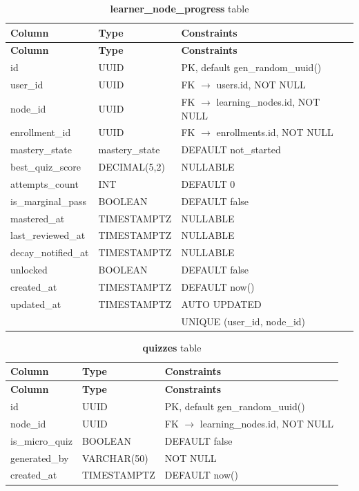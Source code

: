 \begin{longtable}{p{3cm}p{2.5cm}p{5cm}}
\caption{\textbf{learner\_node\_progress} table}
\label{tab:ch04_learner_node_progress}\\
\toprule
\textbf{Column} & \textbf{Type} & \textbf{Constraints} \\
\midrule
\endfirsthead
\toprule
\textbf{Column} & \textbf{Type} & \textbf{Constraints} \\
\midrule
\endhead
id & UUID & PK, default gen\_random\_uuid() \\
user\_id & UUID & FK $\rightarrow$ users.id, NOT NULL \\
node\_id & UUID & FK $\rightarrow$ learning\_nodes.id, NOT NULL \\
enrollment\_id & UUID & FK $\rightarrow$ enrollments.id, NOT NULL \\
mastery\_state & mastery\_state & DEFAULT not\_started \\
best\_quiz\_score & DECIMAL(5,2) & NULLABLE \\
attempts\_count & INT & DEFAULT 0 \\
is\_marginal\_pass & BOOLEAN & DEFAULT false \\
mastered\_at & TIMESTAMPTZ & NULLABLE \\
last\_reviewed\_at & TIMESTAMPTZ & NULLABLE \\
decay\_notified\_at & TIMESTAMPTZ & NULLABLE \\
unlocked & BOOLEAN & DEFAULT false \\
created\_at & TIMESTAMPTZ & DEFAULT now() \\
updated\_at & TIMESTAMPTZ & AUTO UPDATED \\
 &  & UNIQUE (user\_id, node\_id) \\
\bottomrule
\end{longtable}

\begin{longtable}{p{3cm}p{2.5cm}p{5cm}}
\caption{\textbf{quizzes} table}
\label{tab:ch04_quizzes}\\
\toprule
\textbf{Column} & \textbf{Type} & \textbf{Constraints} \\
\midrule
\endfirsthead
\toprule
\textbf{Column} & \textbf{Type} & \textbf{Constraints} \\
\midrule
\endhead
id & UUID & PK, default gen\_random\_uuid() \\
node\_id & UUID & FK $\rightarrow$ learning\_nodes.id, NOT NULL \\
is\_micro\_quiz & BOOLEAN & DEFAULT false \\
generated\_by & VARCHAR(50) & NOT NULL \\
created\_at & TIMESTAMPTZ & DEFAULT now() \\
\bottomrule
\end{longtable}

